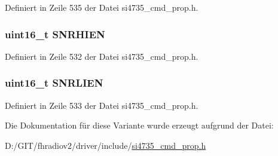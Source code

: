 Definiert in Zeile 535 der Datei si4735\+\_\+cmd\+\_\+prop.\+h.

\hypertarget{unionfm__rsq__int__source_a024d64d4dd48191f3ac5fff26a4e780c}{}
\subsubsection[{S\+N\+R\+H\+I\+E\+N}]{\setlength{\rightskip}{0pt plus 5cm}uint16\+\_\+t S\+N\+R\+H\+I\+E\+N}\label{unionfm__rsq__int__source_a024d64d4dd48191f3ac5fff26a4e780c}


Definiert in Zeile 532 der Datei si4735\+\_\+cmd\+\_\+prop.\+h.

\hypertarget{unionfm__rsq__int__source_a1e8d526e51a38776582287db0a28c55c}{}
\subsubsection[{S\+N\+R\+L\+I\+E\+N}]{\setlength{\rightskip}{0pt plus 5cm}uint16\+\_\+t S\+N\+R\+L\+I\+E\+N}\label{unionfm__rsq__int__source_a1e8d526e51a38776582287db0a28c55c}


Definiert in Zeile 533 der Datei si4735\+\_\+cmd\+\_\+prop.\+h.



Die Dokumentation für diese Variante wurde erzeugt aufgrund der Datei\+:\begin{DoxyCompactItemize}
\item 
D\+:/\+G\+I\+T/fhradiov2/driver/include/\hyperlink{si4735__cmd__prop_8h}{si4735\+\_\+cmd\+\_\+prop.\+h}\end{DoxyCompactItemize}
